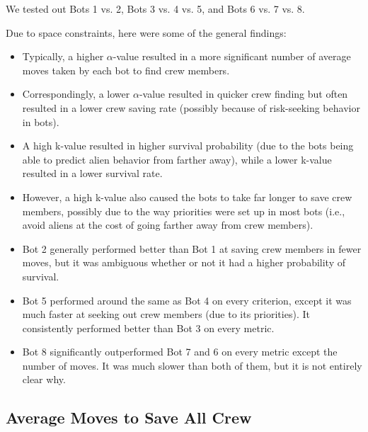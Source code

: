 \documentclass[11pt]{article}
\begin{document}
We tested out Bots 1 vs. 2, Bots 3 vs. 4 vs. 5, and Bots 6 vs. 7 vs. 8.

Due to space constraints, here were some of the general findings:

\begin{itemize}
    \item Typically, a higher $\alpha$-value resulted in a more significant number of average moves taken by each bot to find crew members.
    \item Correspondingly, a lower $\alpha$-value resulted in quicker crew finding but often resulted in a lower crew saving rate (possibly because of risk-seeking behavior in bots).
    \item A high k-value resulted in higher survival probability (due to the bots being able to predict alien behavior from farther away), while a lower k-value resulted in a lower survival rate.
    \item However, a high k-value also caused the bots to take far longer to save crew members, possibly due to the way priorities were set up in most bots (i.e., avoid aliens at the cost of going farther away from crew members).
    \item Bot 2 generally performed better than Bot 1 at saving crew members in fewer moves, but it was ambiguous whether or not it had a higher probability of survival.
    \item Bot 5 performed around the same as Bot 4 on every criterion, except it was much faster at seeking out crew members (due to its priorities). It consistently performed better than Bot 3 on every metric.
    \item Bot 8 significantly outperformed Bot 7 and 6 on every metric except the number of moves. It was much slower than both of them, but it is not entirely clear why.
\end{itemize}

\subsection{Average Moves to Save All Crew}
\end{document}
